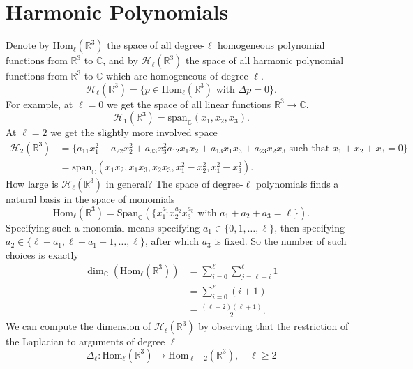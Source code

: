 \documentclass[11pt,letterpaper]{article}
\newcommand{\LP}{\left(}
\newcommand{\RP}{\right)}
\newcommand{\mc}[1]{\mathcal{#1}}
\newcommand{\R}{\mathbb{R}}
\newcommand{\C}{\mathbb{C}}
\begin{document}
\section{Harmonic Polynomials}
Denote by $\mbox{Hom}_\ell(\R^3)$ the space of all degree-$\ell$ homogeneous polynomial functions from $\R^3$ to $\C$, and by $\mc{H}_\ell(\R^3)$ the space of all harmonic polynomial functions from $\R^3$ to $\C$ which are homogeneous of degree $\ell$. \begin{equation}
\mc{H}_\ell(\R^3) = \{ p \in\mbox{Hom}_\ell(\R^3) \mbox{ with } \Delta p = 0 \}.
\end{equation}
For example, at $\ell = 0$ we get the space of all linear functions $\R^3 \to \C$. \begin{equation}
\mc{H}_1(\R^3) = \mbox{span}_\C (x_1, x_2, x_3).
\end{equation}
At $\ell = 2$ we get the slightly more involved space \begin{equation}
\begin{aligned}
\mc{H}_2(\R^3) &  = \{ a_{11} x_1^2 + a_{22} x_2^2 + a_{33} x_3^2 a_{12} x_1 x_2 + a_{13} x_1 x_3 + a_{23} x_2 x_3 \mbox{ such that } x_1 + x_2 + x_3 = 0\} \\
& = \mbox{span}_\C \LP x_1 x_2, x_1 x_3, x_2 x_3, x_1^2 - x_2^2, x_1^2 - x_3^2 \RP. 
\end{aligned}
\end{equation}
How large is $\mc{H}_\ell(\R^3)$ in general? The space of degree-$\ell$ polynomials finds a natural basis in the space of monomials \begin{equation}
\mbox{Hom}_\ell(\R^3) = \mbox{Span}_\C \LP \{ x_1^{a_1} x_2^{a_2} x_3^{a_3} \mbox{ with } a_1 + a_2 + a_3 = \ell \} \RP.
\end{equation}
Specifying such a monomial means specifying $a_1 \in \{0, 1, \ldots, \ell\}$, then specifying $a_2 \in \{\ell - a_1, \ell - a_1 + 1, \ldots, \ell\}$, after which $a_3$ is fixed. So the number of such choices is exactly \begin{equation}
\begin{aligned}
\dim_\C \LP \mbox{Hom}_\ell(\R^3) \RP & = \sum_{i=0}^\ell \sum_{j=\ell - i}^{\ell} 1 \\
& = \sum_{i=0}^\ell (i+1) \\
& = \frac{(\ell + 2)(\ell + 1)}{2}.
\end{aligned}
\end{equation}
We can compute the dimension of $\mc{H}_\ell(\R^3)$ by observing that the restriction of the Laplacian to arguments of degree $\ell$ \begin{equation}
\Delta_\ell : \mbox{Hom}_\ell(\R^3) \to \mbox{Hom}_{\ell - 2}(\R^3), \quad \ell \geq 2
\end{equation}
\end{document}
